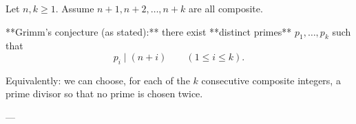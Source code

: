 Let \(n,k\ge 1\). Assume \(n+1,n+2,\dots,n+k\) are all composite.

**Grimm’s conjecture (as stated):** there exist **distinct primes** \(p_1,\dots,p_k\) such that
\[
 p_i\mid (n+i)\qquad (1\le i\le k).
\]

Equivalently: we can choose, for each of the \(k\) consecutive composite integers, a prime divisor
so that no prime is chosen twice.

---
